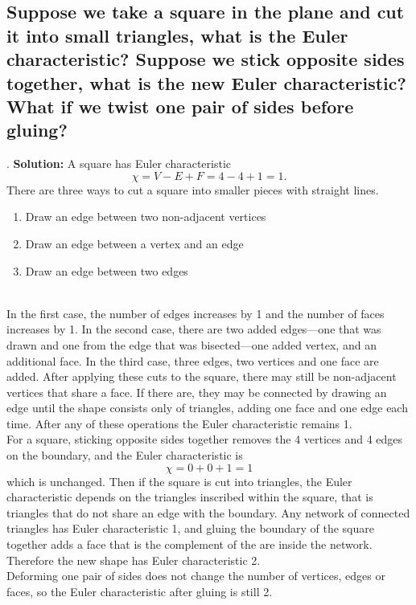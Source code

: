 \documentclass{article}
\newcommand{\exercise}[1]{\subsection{\normalfont #1}}
\newcommand{\solution}{\indent\indent \textbf{Solution: }}
\begin{document}
\exercise{Suppose we take a square in the plane and cut it into small triangles, what is the Euler characteristic? Suppose we stick opposite sides together, what is the new Euler characteristic? What if we twist one pair of sides before gluing?}. %
\solution A square has Euler characteristic
$$\chi = V - E + F = 4 - 4 +1 = 1.$$
\indent There are three ways to cut a square into smaller pieces with straight lines. 
\begin{enumerate}
\item Draw an edge between two non-adjacent vertices
\item Draw an edge between a vertex and an edge
\item Draw an edge between two edges 
\end{enumerate}
\quad \\
\indent In the first case, the number of edges increases by 1 and the number of faces increases by 1. In the second case, there are two added edges—one that was drawn and one from the edge that was bisected—one added vertex, and an additional face. In the third case, three edges, two vertices and one face are added. After applying these cuts to the square, there may still be non-adjacent vertices that share a face. If there are, they may be connected by drawing an edge until the shape consists only of triangles, adding one face and one edge each time. After any of these operations the Euler characteristic remains 1.\\
\indent For a square, sticking opposite sides together removes the 4 vertices and 4 edges on the boundary, and the Euler characteristic is 
$$\chi = 0 + 0 +1 = 1$$
which is unchanged. Then if the square is cut into triangles, the Euler characteristic depends on the triangles inscribed within the square, that is triangles that do not share an edge with the boundary. Any network of connected triangles has Euler characteristic 1, and gluing the boundary of the square together adds a face that is the complement of the are inside the network. Therefore the new shape has Euler characteristic 2. \\
\indent Deforming one pair of sides does not change the number of vertices, edges or faces, so the Euler characteristic after gluing is still 2. 
\end{document}
